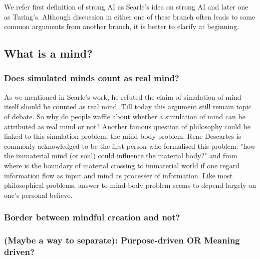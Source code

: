 \documentclass[11pt]{article}
\begin{document}
We refer first definition of strong AI as Searle's idea on strong AI and later one as Turing's. Although discussion in either one of these branch often leads to some common arguments from another branch, it is better to clarify at beginning. 

\subsection{What is a mind?}

\subsubsection{Does simulated minds count as real mind?}

As we mentioned in Searle's work, he refuted the claim of simulation of mind itself should be counted as real mind. Till today this argument still remain topic of debate.  So why do people waffle about whether a simulation of mind can be attributed as real mind or not? Another famous question of philosophy could be linked to this simulation problem, the mind-body problem. Rene Descartes is commonly acknowledged to be the first person who formalised this problem: "how the immaterial mind (or soul) could influence the material body?" and from where is the boundary of material crossing to immaterial world if one regard information flow as input and mind as processer of information. Like most philosophical problems, answer to mind-body problem seems to depend largely on one's personal believe.

\subsubsection{Border between mindful creation and not?}

\subsubsection{(Maybe a way to separate): Purpose-driven OR Meaning driven?}
 
\end{document}
